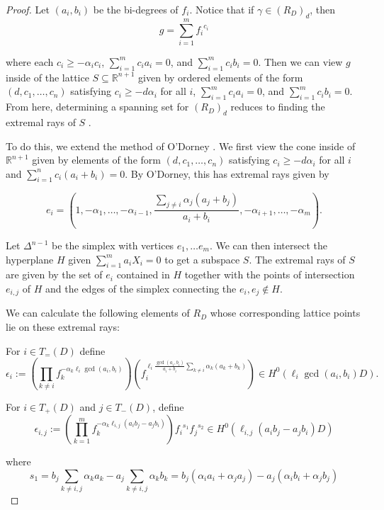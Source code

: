 \documentclass{amsart}
\theoremstyle{plain}
\theoremstyle{definition}
\theoremstyle{remark}
\numberwithin{equation}{section}
\newcommand\bida{a}
\newcommand\bidb{b}
\begin{document}
\begin{proof}
Let $(\bida_i, \bidb_i)$ be the bi-degrees of $f_i$. Notice that if $\gamma
\in (R_D)_d$, then 
\[
	g = \sum_{i=1}^m {f_i}^{c_i}
\]

\noindent
where each $c_i \ge - \alpha_i c_i$, $\sum_{i=1}^m c_i \bida_i = 0$,
and $\sum_{i=1}^m c_i \bidb_i = 0$. Then we can view $g$ inside of the
lattice $S \subseteq \mathbb{R}^{n + 1}$ given by ordered elements of
the form $(d, c_1, \ldots, c_n)$ satisfying $c_i \ge - d \alpha_i$
for all $i$, $\sum_{i=1}^m c_i \bida_i = 0$, and $\sum_{i = 1}^m c_i \bidb_i =
 0$. From here, determining a spanning set for $(R_D)_d$ reduces to
finding the extremal rays of $S$ .

To do this, we extend the method of O'Dorney . We first
view the cone inside of $\mathbb{R}^{n+1}$ given by elements of the
form $(d, c_1, \ldots, c_n)$ satisfying $c_i \ge -d \alpha_i$ for
all $i$ and $\sum_{i = 1}^n c_i (\bida_i + \bidb_i) =0$. By O'Dorney, this
has extremal rays given by
 
\[
	e_i = (1, -\alpha_1, \ldots, -\alpha_{i-1}, \frac{\sum_{j \ne i}
	\alpha_j(\bida_j+ \bidb_j)}{\bida_i + \bidb_i}, -\alpha_{i + 1}, \ldots, - \alpha_m).
\]

Let $\Delta^{n-1}$ be the simplex with vertices $e_1, \ldots e_m$.
We can then intersect the hyperplane $H$ given $\sum_{i=1}^m \bida_i X_i
= 0$ to get a subspace $S$. The extremal rays of $S$ are given
by the set of $e_i$ contained in $H$ together with the points of
intersection $e_{i, j}$ of $H$ and the edges of the simplex
connecting the $e_i, e_j \not \in H$.

We can calculate the following elements of $R_D$ whose
corresponding lattice points lie on these extremal rays:

For $i \in T_=(D)$
define
\[
	\epsilon_i := (\prod_{k \ne i} f_k^{-\alpha_k \ell_i \gcd(\bida_i, \bidb_i)})
	(f_i^{\ell_i \frac{\gcd(\bida_i, \bidb_i)}{\bida_i + \bidb_i}\sum_{k \ne i}
	\alpha_k (\bida_k + \bidb_k)}) \in H^0(\ell_i \gcd(\bida_i, \bidb_i) D).
\]

For $i \in T_+(D)$ and $j \in T_-(D)$, define
\[
	\epsilon_{i, j} := (\prod_{k = 1}^m f_k^{-\alpha_k \ell_{i,j} (\bida_i \bidb_
j - \bida_j \bidb_i)}) {f_i}^{s_1} {f_j}^{s_2} \in H^0(\ell_{i,j}(\bida_i \bidb_j - 
\bida_j \bidb_i)D)
\]

where
\[
	s_1 = \bidb_j \sum_{k \ne i,j} \alpha_k \bida_k - \bida_j \sum_{k\ne i, j}
	\alpha_k \bidb_k = b_j (\alpha_i a_i + \alpha_j a_j) - a_j (\alpha_i b_i + \alpha_j b_j)
\]


\end{proof}
\end{document}

